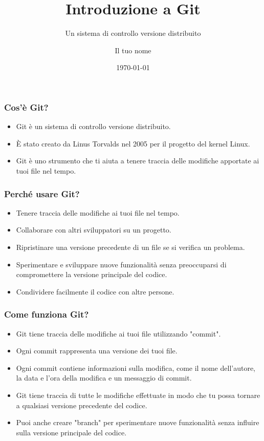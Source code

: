 \documentclass{beamer}
\title{Introduzione a Git}
\subtitle{Un sistema di controllo versione distribuito}
\author{Il tuo nome}
\institute{La tua università}
\date{\today}
\begin{document}
\frame{\titlepage}

\begin{frame}
\frametitle{Cos'è Git?}
\begin{itemize}
\item Git è un sistema di controllo versione distribuito.
\item È stato creato da Linus Torvalds nel 2005 per il progetto del kernel Linux.
\item Git è uno strumento che ti aiuta a tenere traccia delle modifiche apportate ai tuoi file nel tempo.
\end{itemize}
\end{frame}

\begin{frame}
\frametitle{Perché usare Git?}
\begin{itemize}
\item Tenere traccia delle modifiche ai tuoi file nel tempo.
\item Collaborare con altri sviluppatori su un progetto.
\item Ripristinare una versione precedente di un file se si verifica un problema.
\item Sperimentare e sviluppare nuove funzionalità senza preoccuparsi di compromettere la versione principale del codice.
\item Condividere facilmente il codice con altre persone.
\end{itemize}
\end{frame}

\begin{frame}
\frametitle{Come funziona Git?}
\begin{itemize}
\item Git tiene traccia delle modifiche ai tuoi file utilizzando "commit".
\item Ogni commit rappresenta una versione dei tuoi file.
\item Ogni commit contiene informazioni sulla modifica, come il nome dell'autore, la data e l'ora della modifica e un messaggio di commit.
\item Git tiene traccia di tutte le modifiche effettuate in modo che tu possa tornare a qualsiasi versione precedente del codice.
\item Puoi anche creare "branch" per sperimentare nuove funzionalità senza influire sulla versione principale del codice.
\end{itemize}
\end{frame}
\end{document}
